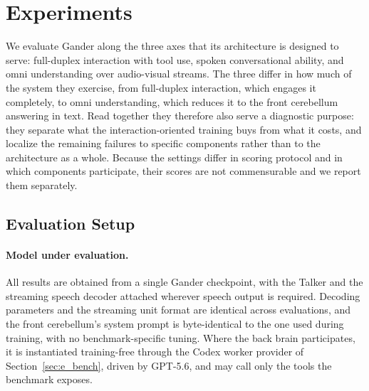 \section{Experiments}
\label{sec:main_results}

We evaluate Gander along the three axes that its architecture is designed to serve:
full-duplex interaction with tool use, spoken conversational ability, and omni understanding
over audio-visual streams. The three differ in how much of the system they exercise, from
full-duplex interaction, which engages it completely, to omni understanding, which reduces it
to the front cerebellum answering in text. Read together they therefore also serve a diagnostic
purpose: they separate what the interaction-oriented training buys from what it costs, and
localize the remaining failures to specific components rather than to the architecture as a
whole. Because the settings differ in scoring protocol and in which components participate,
their scores are not commensurable and we report them separately.

\subsection{Evaluation Setup}
\label{sec:eval_setup}

\paragraph{Model under evaluation.}
All results are obtained from a single Gander checkpoint, with the Talker and the streaming
speech decoder attached wherever speech output is required. Decoding parameters and the streaming
unit format are identical across evaluations, and the front cerebellum's system prompt is
byte-identical to the one used during training, with no benchmark-specific tuning. Where the back
brain participates, it is instantiated training-free through the Codex worker provider of
Section~\ref{sec:e_bench}, driven by GPT-5.6, and may call only the tools the benchmark exposes.

